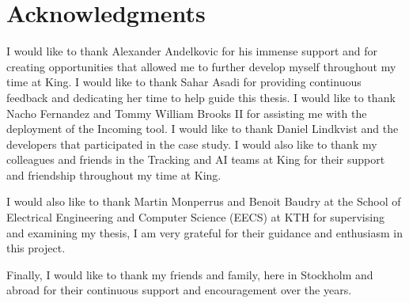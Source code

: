 
\clearpage
\thispagestyle{empty}
\chapter*{Acknowledgments}


I would like to thank Alexander Andelkovic for his immense support and for creating opportunities that allowed me to further develop myself throughout my time at King. I would like to thank Sahar Asadi for providing continuous feedback and dedicating her time to help guide this thesis. I would like to thank Nacho Fernandez and Tommy William Brooks II for assisting me with the deployment of the Incoming tool. I would like to thank Daniel Lindkvist and the developers that participated in the case study.  I would also like to thank my colleagues and friends in the Tracking and AI teams at King for their support and friendship throughout my time at King. 

I would also like to thank Martin Monperrus and Benoit Baudry at the School of Electrical Engineering and Computer Science (EECS) at KTH for supervising and examining my thesis, I am very grateful for their guidance and enthusiasm in this project.

Finally, I would like to thank my friends and family, here in Stockholm and abroad for their continuous support and encouragement over the years. 

\clearpage
